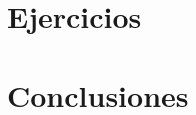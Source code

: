 \documentclass[hidelinks,a4paper,11pt, nofootinbib]{article}
\begin{document}
\maketitle

\tableofcontents
\newpage

\section{Ejercicios}

\newpage

\section{Conclusiones}

\newpage

%
%
\end{document}
